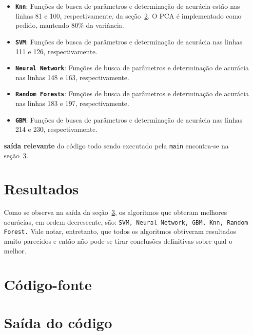 \documentclass[10pt]{article}
\newcommand{\tbf}[1]{\textbf{#1}}
\newcommand{\ttt}[1]{\texttt{#1}}
\begin{document}
\begin{itemize}
    \item \tbf{\ttt{Knn}}: Funções de busca de parâmetros e determinação de
        acurácia estão nas linhas 81 e 100, respectivamente, da
        seção~\ref{code}. O PCA é implementado como pedido, mantendo 80\%
        da variância.

    \item \tbf{\ttt{SVM}}: Funções de busca de parâmetros e determinação
        de acurácia nas linhas 111 e 126, respectivamente.

    \item \tbf{\ttt{Neural Network}}: Funções de busca de parâmetros e
        determinação de acurácia nas linhas 148 e 163, respectivamente.

    \item \tbf{\ttt{Random Forests}}: Funções de busca de parâmetros e
        determinação de acurácia nas linhas 183 e 197, respectivamente.

    \item \tbf{\ttt{GBM}}: Funções de busca de parâmetros e determinação
        de acurácia nas linhas 214 e 230, respectivamente.
\end{itemize}

\tbf{saída relevante} do código todo sendo executado pela \ttt{main}
encontra-se na seção~\ref{output}.

\section{Resultados}
Como se observa na saída da seção~\ref{output}, os algoritmos que obteram
melhores acurácias, em ordem decrescente, são: \ttt{SVM, Neural Network, GBM,
Knn, Random Forest.}
Vale notar, entretanto, que todos os algoritmos obtiveram resultados muito
parecidos e então não pode-se tirar conclusões definitivas sobre qual o
melhor.

\newpage
\section{Código-fonte}
\label{code}


\newpage

\section{Saída do código}
\label{output}


\printbibliography
\end{document}
